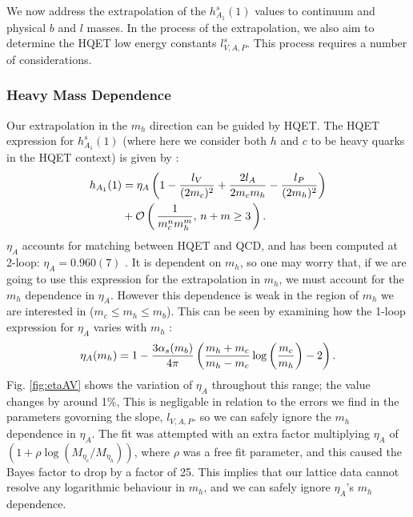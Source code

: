We now address the extrapolation of the $h_{A_1}^s(1)$ values to continuum and physical $b$ and $l$ masses. In the process of the extrapolation, we also aim to determine the HQET low energy constants $l^s_{V,A,P}$. This process requires a number of considerations.

\subsubsection{Heavy Mass Dependence}
\label{sec:BsDsstar_heavymass}

Our extrapolation in the $m_h$ direction can be guided by HQET. The HQET expression for $h^s_{A_1}(1)$ (where here we consider both $h$ and $c$ to be heavy quarks in the HQET context) is given by \cite{Falk:1992wt,Mannel:1994kv}:
\begin{align}
  \label{eq:hqet}
  h_{A_1}(1) &= \eta_A \left( 1 - {l_V\over (2m_c)^2} + {2l_A \over 2 m_c m_h} - { l_P \over (2m_h)^2 } \right)  \\ \nonumber &+ \mathcal{O}\left( \, {1\over m_c^n m_h^m}, \, n+m\geq 3 \, \right).
\end{align}
$\eta_A$ accounts for matching between HQET and QCD, and has been computed at 2-loop: $\eta_A = 0.960(7)$ \cite{PhysRevLett.76.4124}. It is dependent on $m_h$, so one may worry that, if we are going to use this expression for the extrapolation in $m_h$, we must account for the $m_h$ dependence in $\eta_A$. However this dependence is weak in the region of $m_h$ we are interested in ($m_c \leq m_h \leq m_b$). This can be seen by examining how the 1-loop expression for $\eta_A$ varies with $m_h$ \cite{PASCHALIS1983473}:
\begin{align}
  \eta_A(m_h) = 1 - {3 \alpha_s(m_b) \over 4\pi} \left( {m_h+m_c\over m_h-m_c} \log\left({m_c\over m_h}\right) - 2 \right).
\end{align}
Fig. \ref{fig:etaAV} shows the variation of $\eta_A$ throughout this range; the value changes by around 1\%, This is negligable in relation to the errors we find in the parameters govorning the slope, $l_{V,A,P}$. so we can safely ignore the $m_h$ dependence in $\eta_A$. The fit was attempted with an extra factor multiplying $\eta_A$ of $(1+\rho \log(M_{\eta_c}/M_{\eta_h}))$, where $\rho$ was a free fit parameter, and this caused the Bayes factor to drop by a factor of 25. This implies that our lattice data cannot resolve any logarithmic behaviour in $m_h$, and we can safely ignore $\eta_A$'s $m_h$ dependence.

